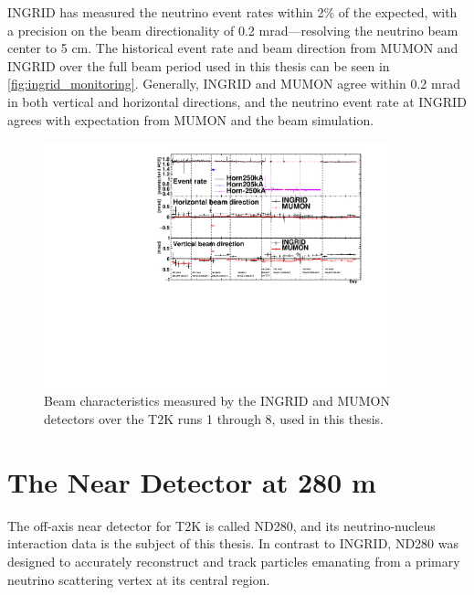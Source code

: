 INGRID has measured the neutrino event rates within 2\% of the expected\cite{t2k_2015}, with a precision on the beam directionality of 0.2 mrad---resolving the neutrino beam center to 5 cm. The historical event rate and beam direction from MUMON and INGRID over the full beam period used in this thesis can be seen in \autoref{fig:ingrid_monitoring}. Generally, INGRID and MUMON agree within 0.2 mrad in both vertical and horizontal directions, and the neutrino event rate at INGRID agrees with expectation from MUMON and the beam simulation.
\begin{figure}[h]
	\includegraphics[width=0.9\textwidth, trim={0mm 0mm 0mm 0mm}, clip,page=1]{figures/det_chap/ingrid/INGRID_official_plot_until74}
	\caption{Beam characteristics measured by the INGRID and MUMON detectors over the T2K runs 1 through 8, used in this thesis.}
	\label{fig:ingrid_monitoring}
\end{figure}

\section{The Near Detector at 280 m}
\label{sec:nd280}
The off-axis near detector for T2K is called ND280, and its neutrino-nucleus interaction data is the subject of this thesis. In contrast to INGRID, ND280 was designed to accurately reconstruct and track particles emanating from a primary neutrino scattering vertex at its central region.

